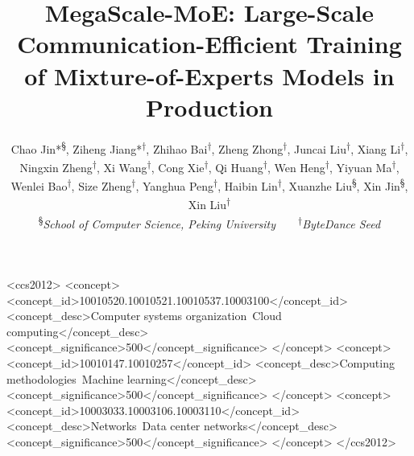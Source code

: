 \documentclass[sigplan,twocolumn]{acmart}
\newcommand{\sysname}{MegaScale-MoE\xspace}
\begin{document}

\title{\sysname: Large-Scale Communication-Efficient Training of Mixture-of-Experts Models in Production}



\newcommand*{\affmark}[1][*]{\textsuperscript{#1}}
\newcommand*{\affaddr}[1]{#1}

\author{
    Chao Jin*\affmark[\S], Ziheng Jiang*\affmark[$\dag$], Zhihao Bai\affmark[$\dag$], Zheng Zhong\affmark[$\dag$], Juncai Liu\affmark[$\dag$], Xiang Li\affmark[$\dag$], Ningxin Zheng\affmark[$\dag$], Xi Wang\affmark[$\dag$], Cong Xie\affmark[$\dag$], Qi Huang\affmark[$\dag$], Wen Heng\affmark[$\dag$], Yiyuan Ma\affmark[$\dag$], Wenlei Bao\affmark[$\dag$], Size Zheng\affmark[$\dag$], Yanghua Peng\affmark[$\dag$], Haibin Lin\affmark[$\dag$], Xuanzhe Liu\affmark[\S], Xin Jin\affmark[\S], Xin Liu\affmark[$\dag$] \\
\affaddr{\affmark[\S]{\textit{School of Computer Science, Peking University}}}~~~~\affaddr{\affmark[$\dag$]{\textit{ByteDance Seed}}}
}

\begin{CCSXML}
<ccs2012>
   <concept>
       <concept_id>10010520.10010521.10010537.10003100</concept_id>
       <concept_desc>Computer systems organization~Cloud computing</concept_desc>
       <concept_significance>500</concept_significance>
       </concept>
   <concept>
       <concept_id>10010147.10010257</concept_id>
       <concept_desc>Computing methodologies~Machine learning</concept_desc>
       <concept_significance>500</concept_significance>
       </concept>
   <concept>
       <concept_id>10003033.10003106.10003110</concept_id>
       <concept_desc>Networks~Data center networks</concept_desc>
       <concept_significance>500</concept_significance>
       </concept>
 </ccs2012>
\end{CCSXML}


\end{document}

